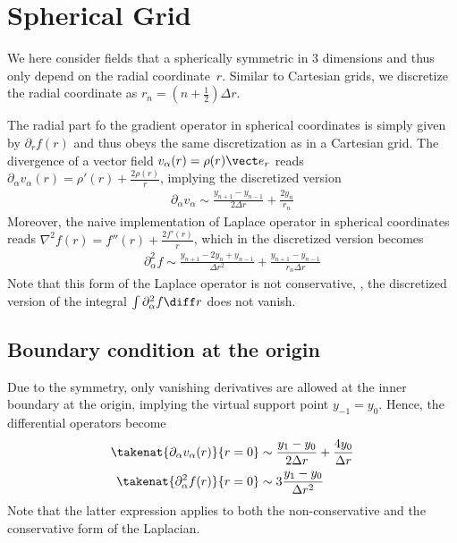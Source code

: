 \documentclass[
	superscriptaddress,
	twocolumn,
	aps, prl
]{revtex4-1}
\newcommand{\dr}{\Delta r}
\begin{document}
\section{Spherical Grid}
We here consider fields that a spherically symmetric in $3$ dimensions and thus only depend on the radial coordinate~$r$.
Similar to Cartesian grids, we discretize the radial coordinate as $r_n = (n + \frac12) \dr$.

The radial part fo the gradient operator in spherical coordinates is simply given by $\partial_r f(r)$ and thus obeys the same discretization as in a Cartesian grid.
The divergence of a vector field $v_\alpha(r) = \rho(r) \vect e_r$ reads
$\partial_\alpha v_\alpha(r) =  \rho'(r) + \frac{2\rho(r)}{r}$, implying the discretized version
\begin{align}
	\partial_\alpha v_\alpha \sim
		\frac{y_{n+1} - y_{n-1}}{2\dr}
		+ \frac{2y_n}{r_n}
\end{align}
Moreover, the naive implementation of Laplace operator in spherical coordinates reads $\nabla^2 f(r) = f''(r) + \frac{2f'(r)}{r}$, which in the discretized version becomes
\begin{align}
	\partial_\alpha^2 f \sim
		\frac{y_{n+1} - 2 y_n + y_{n-1}}{\dr^2}
		+ \frac{y_{n+1} - y_{n-1}}{r_n \dr}
\end{align}
Note that this form of the Laplace operator is not conservative, \ie, the discretized version of the integral $\int \partial_\alpha^2 f \diff r$  does not vanish.


\subsection{Boundary condition at the origin}
Due to the symmetry, only vanishing derivatives are allowed at the inner boundary at the origin, implying the virtual support point $y_{-1} = y_0$.
Hence, the differential operators become
\begin{subequations}
\begin{align}
	\takenat{\partial_\alpha v_\alpha(r)}{r=0} &\sim
		\frac{y_1 - y_0}{2\dr}
		+ \frac{4y_0}{\dr}
\\
	\takenat{\partial_\alpha^2 f(r)}{r=0} &\sim
		3\frac{y_1 -  y_0}{\dr^2}
\end{align}
\end{subequations}
Note that the latter expression applies to both the non-conservative and the conservative form of the Laplacian.
\end{document}
